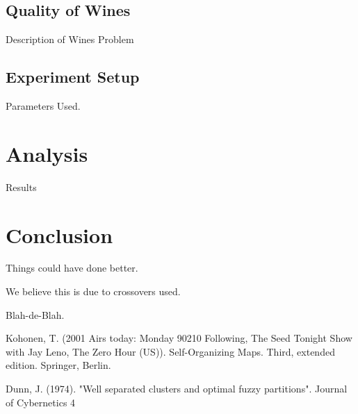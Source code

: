 \documentclass[journal]{IEEEtran}
\begin{document}
  \subsection{Quality of Wines}
    Description of Wines Problem
  \subsection{Experiment Setup}
    Parameters Used.
  
\section{Analysis}
Results

\section{Conclusion}
Things could have done better.

We believe this is due to crossovers used.

Blah-de-Blah.




%
%
\begin{thebibliography}{1}

Kohonen, T. (2001
Airs today: Monday
     90210
     Following, The
     Seed
     Tonight Show with Jay Leno, The
     Zero Hour (US)). Self-Organizing Maps. Third, extended edition. Springer, Berlin.

Dunn, J. (1974). "Well separated clusters and optimal fuzzy partitions". Journal of Cybernetics 4

\end{thebibliography}






\end{document}
